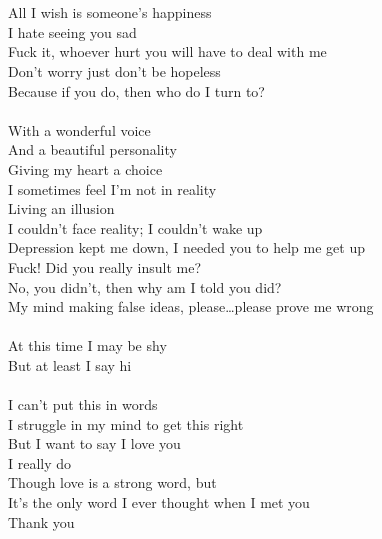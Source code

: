 \documentclass[12pt, b5paper]{article}
\begin{document}
\\\\All I wish is someone’s happiness
\\I hate seeing you sad
\\Fuck it, whoever hurt you will have to deal with me 
\\Don’t worry just don’t be hopeless
\\Because if you do, then who do I turn to?
\\\\With a wonderful voice 
\\And a beautiful personality 
\\Giving my heart a choice 
\\I sometimes feel I’m not in reality
\\Living an illusion
\\I couldn’t face reality; I couldn’t wake up
\\Depression kept me down, I needed you to help me get up
\\Fuck! Did you really insult me?
\\No, you didn’t, then why am I told you did?
\\My mind making false ideas, please…please prove me wrong 
\\\\At this time I may be shy 
\\But at least I say hi
\\\\I can’t put this in words 
\\I struggle in my mind to get this right 
\\But I want to say I love you 
\\I really do 
\\Though love is a strong word, but
\\It’s the only word I ever thought when I met you
\\Thank you

\newpage
\end{document}
